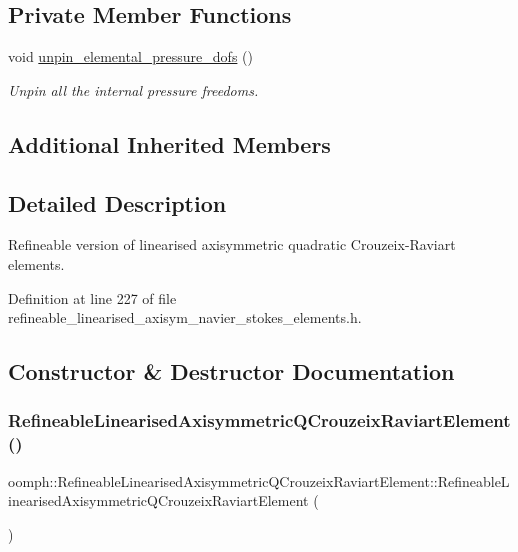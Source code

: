 \subsection*{Private Member Functions}
\begin{DoxyCompactItemize}
\item 
void \hyperlink{classoomph_1_1RefineableLinearisedAxisymmetricQCrouzeixRaviartElement_ab531f0a504465f6242f931dc5c01f008}{unpin\+\_\+elemental\+\_\+pressure\+\_\+dofs} ()
\begin{DoxyCompactList}\small\item\em Unpin all the internal pressure freedoms. \end{DoxyCompactList}\end{DoxyCompactItemize}
\subsection*{Additional Inherited Members}


\subsection{Detailed Description}
Refineable version of linearised axisymmetric quadratic Crouzeix-\/\+Raviart elements. 

Definition at line 227 of file refineable\+\_\+linearised\+\_\+axisym\+\_\+navier\+\_\+stokes\+\_\+elements.\+h.



\subsection{Constructor \& Destructor Documentation}
\mbox{\label{classoomph_1_1RefineableLinearisedAxisymmetricQCrouzeixRaviartElement_a3a136f5f2bc6e8f0e99218b4057d7c9f}} 
\subsubsection{\texorpdfstring{Refineable\+Linearised\+Axisymmetric\+Q\+Crouzeix\+Raviart\+Element()}{RefineableLinearisedAxisymmetricQCrouzeixRaviartElement()}}
{\footnotesize\ttfamily oomph\+::\+Refineable\+Linearised\+Axisymmetric\+Q\+Crouzeix\+Raviart\+Element\+::\+Refineable\+Linearised\+Axisymmetric\+Q\+Crouzeix\+Raviart\+Element (\begin{DoxyParamCaption}{ }\end{DoxyParamCaption})\hspace{0.3cm}{\ttfamily [inline]}}



